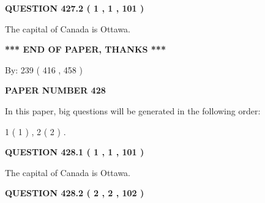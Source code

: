 \documentclass[12pt]{article}
\begin{document}
{\textbf{\Large{QUESTION
427.2 
 ( 1 , 1 , 101 )
}}}
  
  
 
 
\noindent{}
 
 
The capital of Canada is Ottawa.
 
 
 
 
   
   
\vspace{1.0in} 
{\textbf{\large{ *** END OF PAPER, THANKS *** }}} 
   
   
\hspace{1.0in} By: 
 239 ( 416 ,  458 )
   
   
   
   
\newpage 
\setcounter{page}{ 
   428001 } 
   
   
   
   
 {\textbf{ \Large{ PAPER NUMBER  428  }}}
   
   
\vspace{0.2in}
   
   
   
   
   
\vspace{0.2in}
   
In this paper, big questions will be generated in the following order: 
   
   
   1 ( 1 )
 ,
   2 ( 2 )
 .
  
\vspace{0.2in}
  
{\textbf{\Large{QUESTION
428.1 
 ( 1 , 1 , 101 )
}}}
  
  
 
 
\noindent{}
 
 
The capital of Canada is Ottawa.
 
 
 
 
  
\vspace{0.2in}
  
{\textbf{\Large{QUESTION
428.2 
 ( 2 , 2 , 102 )
}}}
  
  
 
 
\noindent{}
 
\end{document}
